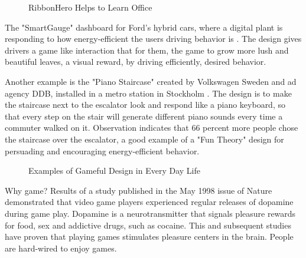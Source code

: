 \begin{figure}[htbp]
	\centering
		\caption{RibbonHero Helps to Learn Office}
		\label{fig:ribbon}
\end{figure}

The "SmartGauge" dashboard for Ford's hybrid cars, where a digital plant is responding to how energy-efficient the users driving behavior is \cite {ideo2009}. The design gives drivers a game like interaction that for them, the game to grow more lush and beautiful leaves, a visual reward, by driving efficiently, desired behavior. 

Another example is the "Piano Staircase" created by Volkswagen Sweden and ad agency DDB, installed in a metro station in Stockholm \cite {funtheory2009}. The design is to make the staircase next to the escalator look and respond like a piano keyboard, so that every step on the stair will generate different piano sounds every time a commuter walked on it. Observation indicates that 66 percent more people chose the staircase over the escalator, a good example of a "Fun Theory" design for persuading and encouraging energy-efficient behavior.

 \begin{figure}[htbp]
	\centering
		\caption{Examples of Gameful Design in Every Day Life}
		\label{fig:ixd}
\end{figure}	

Why game? Results of a study published in the May 1998 issue of Nature \cite {koepp1998evidence} demonstrated that video game players experienced regular releases of dopamine during game play. Dopamine is a
neurotransmitter that signals pleasure rewards for food, sex and addictive drugs, such as cocaine. This and subsequent studies have proven that playing games stimulates pleasure centers in the brain. People are hard-wired to enjoy games.

